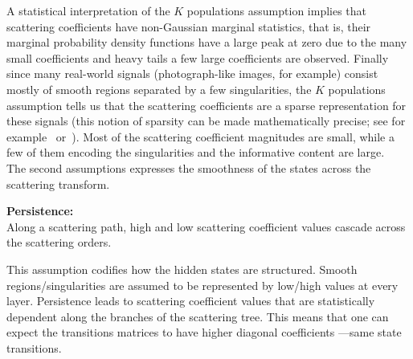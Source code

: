 \documentclass[a4paper,11pt]{report}
\begin{document}
		A statistical interpretation of the $K$ populations assumption implies that scattering coefficients have non-Gaussian marginal statistics, that is, their marginal probability density functions have a large peak at zero due to the many small coefficients and heavy tails a few large coefficients are observed. Finally since many real-world signals (photograph-like images, for example) consist mostly of smooth regions separated by a few singularities, the $K$ populations assumption tells us that the scattering coefficients are a sparse representation for these signals (this notion of sparsity can be made mathematically precise; see for example~\citep{donoho1993unconditional} or~\citep{devore1992image}). Most of the scattering coefficient magnitudes are small, while a few of them encoding the singularities and the informative content are large.\\
		
		The second assumptions expresses the smoothness of the states across the scattering transform.\\
		
		\begin{assumption}\textbf{Persistence:}\\
		  Along a scattering path, high and low scattering coefficient values cascade across the scattering orders.\\
		  \label{assum:Persistence}
		\end{assumption}

		This assumption codifies how the hidden states are structured. Smooth regions/singularities are assumed to be represented by low/high values at every layer. Persistence leads to scattering coefficient values that are statistically dependent along the branches of the scattering tree. This means that one can expect the transitions matrices to have higher diagonal coefficients ---\ie same state transitions.\\
		
\end{document}
